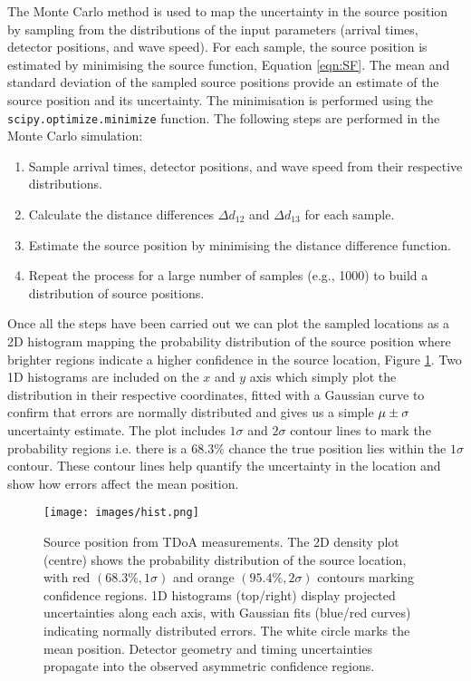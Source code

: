 The Monte Carlo method is used to map the uncertainty in the source position by sampling from the distributions of the input parameters (arrival times, detector positions, and wave speed). For each sample, the source position is estimated by minimising the source function, Equation \ref{eqn:SF}. The mean and standard deviation of the sampled source positions provide an estimate of the source position and its uncertainty. The minimisation is performed using the \lstinline{scipy.optimize.minimize} function. The following steps are performed in the Monte Carlo simulation:
\begin{enumerate}
    \item Sample arrival times, detector positions, and wave speed from their respective distributions.
    \item Calculate the distance differences \(\Delta d_{12}\) and \(\Delta d_{13}\) for each sample. 
    \item Estimate the source position by minimising the distance difference function.
    \item Repeat the process for a large number of samples (e.g., 1000) to build a distribution of source positions.
\end{enumerate}

Once all the steps have been carried out we can plot the sampled locations as a 2D histogram mapping the probability distribution of the source position where brighter regions indicate a higher confidence in the source location, Figure \ref{fig:hist}. Two 1D histograms are included on the $x$ and $y$ axis which simply plot the distribution in their respective coordinates, fitted with a Gaussian curve to confirm that errors are normally distributed and gives us a simple $\mu \space\pm\sigma$ uncertainty estimate. The plot includes $1\sigma$ and $2\sigma$ contour lines to mark the probability regions i.e. there is a $68.3\%$ chance the true position lies within the $1\sigma$ contour. These contour lines help quantify the uncertainty in the location and show how errors affect the mean position. 

\begin{figure}[h!]
    \centering
    \texttt{[image: images/hist.png]}
    \caption{Source position from TDoA measurements. The 2D density plot (centre) shows the probability distribution of the source location, with red $(68.3\%, 1\sigma)$ and orange $(95.4\%, 2\sigma)$ contours marking confidence regions. 1D histograms (top/right) display projected uncertainties along each axis, with Gaussian fits (blue/red curves) indicating normally distributed errors. The white circle marks the mean position. Detector geometry and timing uncertainties propagate into the observed asymmetric confidence regions.}
    \label{fig:hist}
\end{figure}

